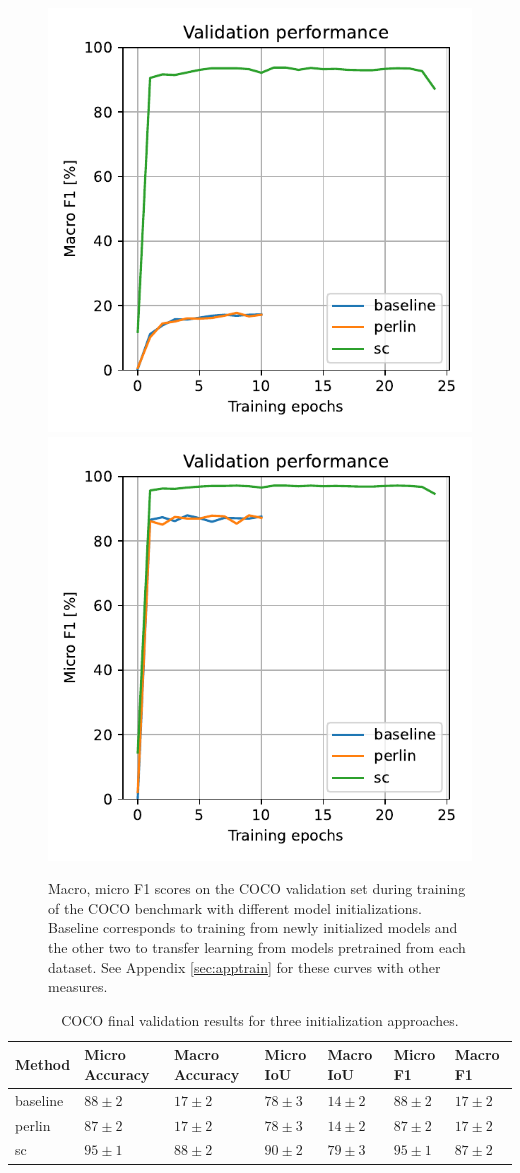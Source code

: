 \documentclass[12pt,fleqn]{article}
\begin{document}
\begin{figure}[H]
    \centering
        \includegraphics[width=.49\linewidth]{coco/Macro F1}
        \includegraphics[width=.49\linewidth]{coco/Micro F1}
    \caption{
        Macro, micro F1 scores on the COCO validation set during training of the COCO benchmark with different model initializations. Baseline corresponds to training from newly initialized models and the other two to transfer learning from models pretrained from each dataset. See Appendix \ref{sec:apptrain} for these curves with other measures.
    }
    \label{fig:cococurves}
\end{figure}\noindent


\begin{table}[H]
    \small
    \centering
    \begin{tabular}{l|llllll}
            Method & Micro Accuracy & Macro Accuracy & Micro IoU & Macro IoU & Micro F1 & Macro F1 \\
            \hline
            baseline & $88 \pm 2$ & $17 \pm 2$ & $78 \pm 3$ & $14 \pm 2$ & $88 \pm 2$ & $17 \pm 2$ \\
            perlin & $87 \pm 2$ & $17 \pm 2$ & $78 \pm 3$ & $14 \pm 2$ & $87 \pm 2$ & $17 \pm 2$ \\
            sc & $95 \pm 1$ & $88 \pm 2$ & $90 \pm 2$ & $79 \pm 3$ & $95 \pm 1$ & $87 \pm 2$ \\
    \end{tabular}
    \caption{
        COCO final validation results for three initialization approaches.
    }
    \label{tab:fbfinal}
\end{table}\noindent
\end{document}
